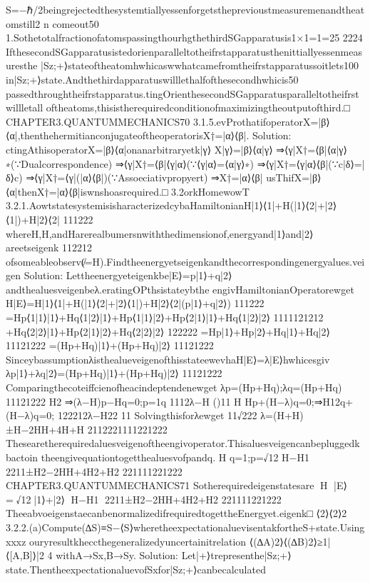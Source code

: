 {{S=−ℏ/2beingrejectedthesystemtiallyessenforgetstheprevioustmeasuremenandtheatomstill2
n
comeout50%
1.SothetotalfractionofatomspassingthourhgthethirdSGapparatusis1×1=1=25%
2224
IfthesecondSGapparatusistedorienparalleltotheifrstapparatusthenittiallyessenmeasuresthe
|Sz;+⟩stateoftheatomhwhicaswwhatcamefromtheifrstapparatussoitlets100%
in|Sz;+⟩state.Andthethirdapparatuswilllethalfofthesecondhwhicis50%
passedthroughtheifrstapparatus.tingOrienthesecondSGapparatusparalleltotheifrstwillletall
oftheatoms,thisistherequiredconditionofmaximizingtheoutputofthird.□
CHAPTER3.QUANTUMMECHANICS70
3.1.5.evProthatifoperatorX=|β⟩⟨α|,thenthehermitianconjugateoftheoperatorisX†=|α⟩⟨β|.
Solution:
ctingAthisoperatorX=|β⟩⟨α|onanarbitraryetk|γ⟩
X|γ⟩=|β⟩⟨α|γ⟩
⇒⟨γ|X†=⟨β|⟨α|γ⟩∗(∵Dualcorrespondence)
⇒⟨γ|X†=⟨β|⟨γ|α⟩(∵⟨γ|α⟩=⟨α|γ⟩∗)
⇒⟨γ|X†=⟨γ|α⟩⟨β|(∵c|δ⟩=|δ⟩c)
⇒⟨γ|X†=⟨γ|(|α⟩⟨β|)(∵Assoeciativpropyert)
⇒X†=|α⟩⟨β|
usThifX=|β⟩⟨α|thenX†=|α⟩⟨β|iswnshoasrequired.□
3.2orkHomewowT
3.2.1.AowtstatesystemisisharacterizedcybaHamiltonianH|1⟩⟨1|+H(|1⟩⟨2|+|2⟩⟨1|)+H|2⟩⟨2|
111222
whereH,H,andHarerealbumersnwiththedimensionof,energyand|1⟩and|2⟩areetseigenk
112212
ofsomeableobserv(̸=H).Findtheenergyetseigenkandthecorrespondingenergyalues.veigen
Solution:
Lettheenergyeteigenkbe|E⟩=p|1⟩+q|2⟩andthealuesveigenbeλ.eratingOPthsistateybthe
engivHamiltonianOperatorewget
H|E⟩=H|1⟩⟨1|+H(|1⟩⟨2|+|2⟩⟨1|)+H|2⟩⟨2|(p|1⟩+q|2⟩)
111222
=Hp⟨1|1⟩|1⟩+Hq⟨1|2⟩|1⟩+Hp⟨1|1⟩|2⟩+Hp⟨2|1⟩|1⟩+Hq⟨1|2⟩|2⟩
1111121212
+Hq⟨2|2⟩|1⟩+Hp⟨2|1⟩|2⟩+Hq⟨2|2⟩|2⟩
122222
=Hp|1⟩+Hp|2⟩+Hq|1⟩+Hq|2⟩
11121222
=(Hp+Hq)|1⟩+(Hp+Hq)|2⟩
11121222
SinceybassumptionλisthealueveigenofthisstateewevhaH|E⟩=λ|E⟩hwhicesgiv
λp|1⟩+λq|2⟩=(Hp+Hq)|1⟩+(Hp+Hq)|2⟩
11121222
Comparingthecoteiffcienofheacindeptendenewget
λp=(Hp+Hq);λq=(Hp+Hq)
11121222
H2
⇒(λ−H)p−Hq=0;p=1q
1112λ−H
()11
H
Hp+(H−λ)q=0;⇒H12q+(H−λ)q=0;
122212λ−H22
11
Solvingthisforλewget
11√222
λ=(H+H)±H−2HH+4H+H
2112221111221222
Thesearetherequiredaluesveigenoftheengivoperator.Thisaluesveigencanbepluggedkbactoin
theengivequationtogetthealuesvofpandq.
H
q=1;p=√12
H−H1
2211±H2−2HH+4H2+H2
221111221222
CHAPTER3.QUANTUMMECHANICS71
Sotherequiredeigenstatesare
H
|E⟩=√12|1⟩+|2⟩
H−H1
2211±H2−2HH+4H2+H2
221111221222
TheeabvoeigenstaecanbenormalizedifrequiredtogettheEnergyet.eigenk□
⟨2⟩⟨2⟩2
3.2.2.(a)Compute(∆S)≡S−⟨S⟩wheretheexpectationaluevisentakfortheS+state.Using
xxxz
ouryresultkheccthegeneralizedyuncertainitrelation
⟨(∆A)2⟩⟨(∆B)2⟩≥1|⟨[A,B]⟩|2
4
withA→Sx,B→Sy.
Solution:
Let|+⟩trepresenthe|Sz;+⟩state.ThentheexpectationaluevofSxfor|Sz;+⟩canbecalculated
}}
